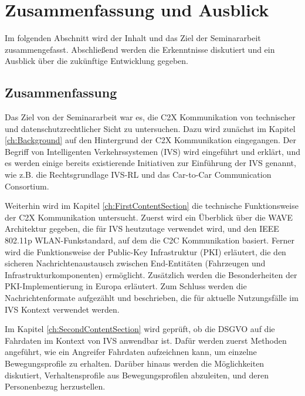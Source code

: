 
\section{Zusammenfassung und Ausblick}
\label{ch:Conclusion}

Im folgenden Abschnitt wird der Inhalt und das Ziel der Seminararbeit zusammengefasst. Abschließend werden die Erkenntnisse diskutiert und ein Ausblick über die zukünftige Entwicklung gegeben. 

\subsection{Zusammenfassung}

Das Ziel von der Seminararbeit war es, die C2X Kommunikation von technischer und datenschutzrechtlicher Sicht zu untersuchen. Dazu wird zunächst im Kapitel \ref{ch:Background} auf den Hintergrund der C2X Kommunikation eingegangen. Der Begriff von Intelligenten Verkehrssystemen (IVS) wird eingeführt und erklärt, und es werden einige bereits existierende Initiativen zur Einführung der IVS genannt, wie z.B. die Rechtsgrundlage IVS-RL und das Car-to-Car Communication Consortium.

Weiterhin wird im Kapitel \ref{ch:FirstContentSection} die technische Funktionsweise der C2X Kommunikation untersucht. Zuerst wird ein Überblick über die WAVE Architektur gegeben, die für IVS heutzutage verwendet wird, und den IEEE 802.11p WLAN-Funkstandard, auf dem die C2C Kommunikation basiert. Ferner wird die Funktionsweise der Public-Key Infrastruktur (PKI) erläutert, die den sicheren Nachrichtenaustausch zwischen End-Entitäten (Fahrzeugen und Infrastrukturkomponenten) ermöglicht. Zusätzlich werden die Besonderheiten der PKI-Implementierung in Europa erläutert. Zum Schluss werden die Nachrichtenformate aufgezählt und beschrieben, die für aktuelle Nutzungsfälle im IVS Kontext verwendet werden. 

Im Kapitel \ref{ch:SecondContentSection} wird geprüft, ob die DSGVO auf die Fahrdaten im Kontext von IVS anwendbar ist. Dafür werden zuerst Methoden angeführt, wie ein Angreifer Fahrdaten aufzeichnen kann, um einzelne Bewegungsprofile zu erhalten. Darüber hinaus werden die Möglichkeiten diskutiert, Verhaltensprofile aus Bewegungsprofilen abzuleiten, und deren Personenbezug herzustellen. 

